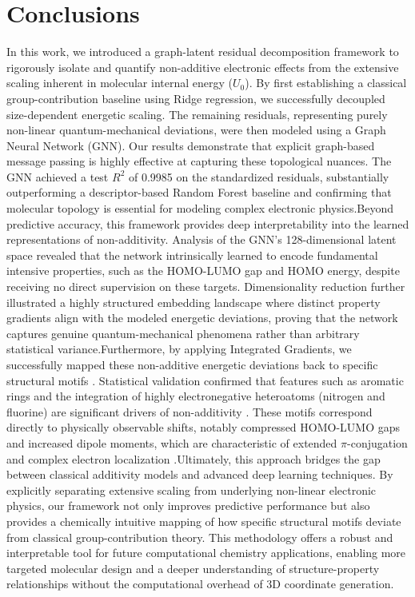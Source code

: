 \documentclass[]{article}
\begin{document}
\section{Conclusions}
\label{sec:conclusions}
In this work, we introduced a graph-latent residual decomposition framework to rigorously isolate and quantify non-additive electronic effects from the extensive scaling inherent in molecular internal energy ($U_0$). By first establishing a classical group-contribution baseline using Ridge regression, we successfully decoupled size-dependent energetic scaling. The remaining residuals, representing purely non-linear quantum-mechanical deviations, were then modeled using a Graph Neural Network (GNN). Our results demonstrate that explicit graph-based message passing is highly effective at capturing these topological nuances. The GNN achieved a test $R^2$ of 0.9985 on the standardized residuals, substantially outperforming a descriptor-based Random Forest baseline and confirming that molecular topology is essential for modeling complex electronic physics.Beyond predictive accuracy, this framework provides deep interpretability into the learned representations of non-additivity. Analysis of the GNN's 128-dimensional latent space revealed that the network intrinsically learned to encode fundamental intensive properties, such as the HOMO-LUMO gap and HOMO energy, despite receiving no direct supervision on these targets. Dimensionality reduction further illustrated a highly structured embedding landscape where distinct property gradients align with the modeled energetic deviations, proving that the network captures genuine quantum-mechanical phenomena rather than arbitrary statistical variance.Furthermore, by applying Integrated Gradients, we successfully mapped these non-additive energetic deviations back to specific structural motifs \citep{sundararajan2017axiomaticattributiondeepnetworks,polat2025xchemagentsagenticaiexplainable,ji2026molledgeradditivegraphneural}. Statistical validation confirmed that features such as aromatic rings and the integration of highly electronegative heteroatoms (nitrogen and fluorine) are significant drivers of non-additivity \citep{lundstrom2022rigorousstudyintegratedgradients,wang2026explainablemolecularpropertyprediction}. These motifs correspond directly to physically observable shifts, notably compressed HOMO-LUMO gaps and increased dipole moments, which are characteristic of extended $\pi$-conjugation and complex electron localization \citep{chen2026interpretablemachinelearningquantuminformed,mick2026datafusioncontrastivealignment,bigting2026martinimapperautomatedfragmentbased}.Ultimately, this approach bridges the gap between classical additivity models and advanced deep learning techniques. By explicitly separating extensive scaling from underlying non-linear electronic physics, our framework not only improves predictive performance but also provides a chemically intuitive mapping of how specific structural motifs deviate from classical group-contribution theory. This methodology offers a robust and interpretable tool for future computational chemistry applications, enabling more targeted molecular design and a deeper understanding of structure-property relationships without the computational overhead of 3D coordinate generation.


{}

\end{document}
